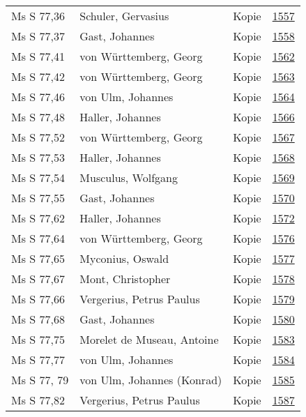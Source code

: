 \documentclass[10pt,a4paper,landscape]{report}
\begin{document}
\begin{longtable}{p{16cm}p{4cm}lr}
Ms S 77,36	&	Schuler, Gervasius	&	Kopie	&	\href{http://130.60.24.72/assignment/1557}{1557}\\
Ms S 77,37	&	Gast, Johannes	&	Kopie	&	\href{http://130.60.24.72/assignment/1558}{1558}\\
Ms S 77,41	&	von Württemberg, Georg	&	Kopie	&	\href{http://130.60.24.72/assignment/1562}{1562}\\
Ms S 77,42	&	von Württemberg, Georg	&	Kopie	&	\href{http://130.60.24.72/assignment/1563}{1563}\\
Ms S 77,46	&	von Ulm, Johannes	&	Kopie	&	\href{http://130.60.24.72/assignment/1564}{1564}\\
Ms S 77,48	&	Haller, Johannes	&	Kopie	&	\href{http://130.60.24.72/assignment/1566}{1566}\\
Ms S 77,52	&	von Württemberg, Georg	&	Kopie	&	\href{http://130.60.24.72/assignment/1567}{1567}\\
Ms S 77,53	&	Haller, Johannes	&	Kopie	&	\href{http://130.60.24.72/assignment/1568}{1568}\\
Ms S 77,54	&	Musculus, Wolfgang	&	Kopie	&	\href{http://130.60.24.72/assignment/1569}{1569}\\
Ms S 77,55	&	Gast, Johannes	&	Kopie	&	\href{http://130.60.24.72/assignment/1570}{1570}\\
Ms S 77,62	&	Haller, Johannes	&	Kopie	&	\href{http://130.60.24.72/assignment/1572}{1572}\\
Ms S 77,64	&	von Württemberg, Georg	&	Kopie	&	\href{http://130.60.24.72/assignment/1576}{1576}\\
Ms S 77,65	&	Myconius, Oswald	&	Kopie	&	\href{http://130.60.24.72/assignment/1577}{1577}\\
Ms S 77,67	&	Mont, Christopher	&	Kopie	&	\href{http://130.60.24.72/assignment/1578}{1578}\\
Ms S 77,66	&	Vergerius, Petrus Paulus	&	Kopie	&	\href{http://130.60.24.72/assignment/1579}{1579}\\
Ms S 77,68	&	Gast, Johannes	&	Kopie	&	\href{http://130.60.24.72/assignment/1580}{1580}\\
Ms S 77,75	&	Morelet de Museau, Antoine	&	Kopie	&	\href{http://130.60.24.72/assignment/1583}{1583}\\
Ms S 77,77	&	von Ulm, Johannes	&	Kopie	&	\href{http://130.60.24.72/assignment/1584}{1584}\\
Ms S 77, 79	&	von Ulm, Johannes (Konrad)	&	Kopie	&	\href{http://130.60.24.72/assignment/1585}{1585}\\
Ms S 77,82	&	Vergerius, Petrus Paulus	&	Kopie	&	\href{http://130.60.24.72/assignment/1587}{1587}\\

\end{longtable}
\end{document}
